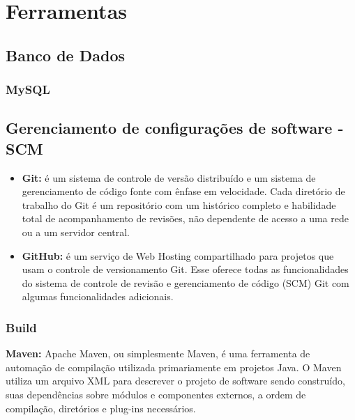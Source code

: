 \chapter{Ferramentas}

\section{Banco de Dados}

\subsection{MySQL}


\section{Gerenciamento de configurações de software - SCM}

\begin{itemize}

\item \textbf{Git:} é um sistema de controle de versão distribuído e um sistema de gerenciamento de código fonte com ênfase em velocidade. Cada diretório de trabalho do Git é um repositório com um histórico completo e habilidade total de acompanhamento de revisões, não dependente de acesso a uma rede ou a um servidor central.

\item \textbf{GitHub:} é um serviço de Web Hosting compartilhado para projetos que usam o controle de versionamento Git. Esse oferece todas as funcionalidades do sistema de controle de revisão e gerenciamento de código (SCM) Git com algumas funcionalidades adicionais.


\end{itemize}

\subsection{Build}

\textbf{Maven:} Apache Maven, ou simplesmente Maven, é uma ferramenta de automação de compilação utilizada primariamente em projetos Java. O Maven utiliza um arquivo XML para descrever o projeto de software sendo construído, suas dependências sobre módulos e componentes externos, a ordem de compilação, diretórios e plug-ins necessários.

